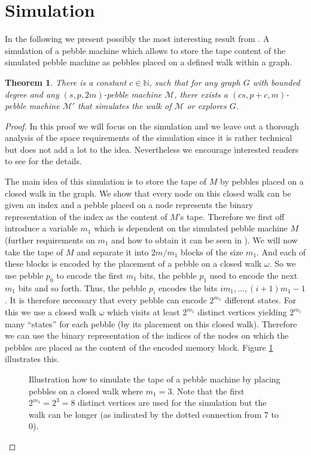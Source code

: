 \documentclass[oneside]{scrartcl}
\newtheorem{thm}{Theorem}
\begin{document}
\section{Simulation}
In the following we present possibly the most interesting result from
\cite{pebbles}. A simulation of a pebble machine which allows to store
the tape content of the simulated pebble machine as pebbles placed on a
defined walk within a graph.
\begin{thm}
  \label{thm:simulation}
  There is a constant $c\in\mathbb{N}$, such that for any graph $G$ with
  bounded degree and any $(s,p,2m)$-pebble machine $\mathcal{M}$, there
  exists a $(cs,p+c,m)$-pebble machine $\mathcal{M}'$ that simulates the
  walk of $\mathcal{M}$ or explores $G$.
\end{thm}
\begin{proof}
  In this proof we will focus on the simulation and we leave out a thorough
  analysis of the space requirements of the simulation since it is rather
  technical but does not add a lot to the idea. Nevertheless we encourage
  interested readers to see \cite{pebbles} for the details.

  The main idea of this simulation is to store the tape of $M$ by pebbles
  placed on a closed walk in the graph. We show that every node on this closed
  walk can be given an index and a pebble placed on a node represents the
  binary representation of the index as the content of $M$'s tape. Therefore we
  first off introduce a variable $m_{1}$ which is dependent on the simulated
  pebble machine $M$ (further requirements on $m_{1}$ and how to obtain it
  can be seen in \cite{pebbles}). We will now take the tape of $M$ and separate
  it into $2m/m_{1}$ blocks of the size $m_{1}$. And each of these blocks is
  encoded by the placement of a pebble on a closed walk $\omega$. So we use
  pebble $p_{0}$ to encode the first $m_{1}$ bits, the pebble $p_{1}$ used to
  encode the next $m_{1}$ bits and so forth. Thus, the pebble $p_{i}$ encodes
  the bits $im_{1},\dots,(i+1)m_{1}-1$. It is therefore necessary that every
  pebble can encode $2^{m_1}$ different states. For this we use a closed walk
  $\omega$ which visits at least $2^{m_1}$ distinct vertices yielding $2^{m_1}$
  many \enquote{states} for each pebble (by its placement on this closed walk).
  Therefore we can use the binary representation of the indices of the nodes
  on which the pebbles are placed as the content of the encoded memory block.
  Figure \ref{fig:tapesim} illustrates this.
  \begin{figure}[h!]
    \caption{Illustration how to simulate the tape of a pebble machine by
      placing pebbles on a closed walk where $m_{1} = 3$. Note that the first
      $2^{m_{1}}=2^{3}=8$ distinct vertices are used for the simulation but the
    walk can be longer (as indicated by the dotted connection from $7$ to $0$).}
    \label{fig:tapesim}
    \begin{center}
      \resizebox{0.6\textwidth}{!}{}
    \end{center}
  \end{figure}


\end{proof}
\end{document}
